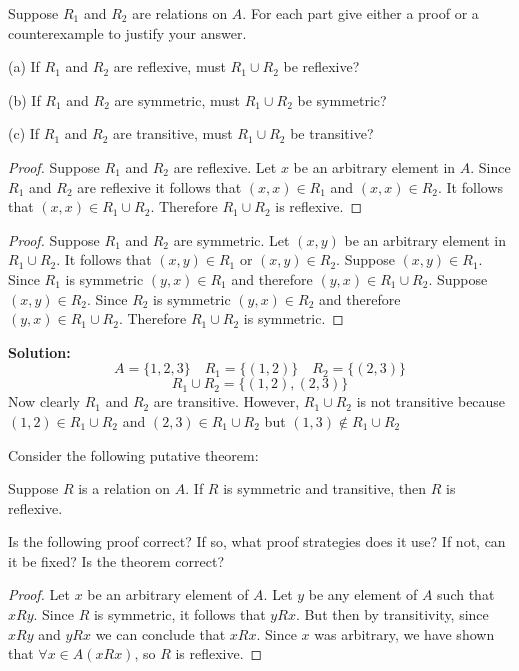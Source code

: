 \begin{tcolorbox}[title=Problem 13, breakable]
    Suppose $R_1$ and $R_2$ are relations on $A$.
    For each part give either a proof or a counterexample to justify your answer.

    (a) If $R_1$ and $R_2$ are reflexive, must $R_1 \cup R_2$ be reflexive?

    (b) If $R_1$ and $R_2$ are symmetric, must $R_1 \cup R_2$ be symmetric?

    (c) If $R_1$ and $R_2$ are transitive, must $R_1 \cup R_2$ be transitive?
\end{tcolorbox}

\begin{proof}
    Suppose $R_1$ and $R_2$ are reflexive.
    Let $x$ be an arbitrary element in $A$.
    Since $R_1$ and $R_2$ are reflexive it follows that $(x, x) \in R_1$ and $(x, x) \in R_2$.
    It follows that $(x, x) \in R_1 \cup R_2$.
    Therefore $R_1 \cup R_2$ is reflexive.
\end{proof}

\begin{proof}
    Suppose $R_1$ and $R_2$ are symmetric.
    Let $(x, y)$ be an arbitrary element in $R_1 \cup R_2$.
    It follows that $(x, y) \in R_1$ or $(x, y) \in R_2$.
    Suppose $(x, y) \in R_1$.
    Since $R_1$ is symmetric $(y, x) \in R_1$ and therefore $(y, x) \in R_1 \cup R_2$.
    Suppose $(x, y) \in R_2$.
    Since $R_2$ is symmetric $(y, x) \in R_2$ and therefore $(y, x) \in R_1 \cup R_2$.
    Therefore $R_1 \cup R_2$ is symmetric.
\end{proof}

\textbf{Solution:}
\[A = \{1, 2, 3\} \quad R_1 = \{(1, 2)\} \quad R_2 = \{(2, 3)\}\]
\[R_1 \cup R_2 = \{(1, 2), (2, 3)\}\]
Now clearly $R_1$ and $R_2$ are transitive. However, $R_1 \cup R_2$ is not transitive because 
    $(1, 2) \in R_1 \cup R_2$ and $(2, 3) \in R_1 \cup R_2$
    but $(1, 3) \not \in R_1 \cup R_2$

\begin{tcolorbox}[title=Problem 22, breakable]
    Consider the following putative theorem:
    \begin{theorem}
        Suppose $R$ is a relation on $A$. If $R$ is symmetric and 
        transitive, then $R$ is reflexive.
    \end{theorem}
    Is the following proof correct? If so, what proof strategies does it use?
    If not, can it be fixed? Is the theorem correct?
    \begin{proof}
        Let $x$ be an arbitrary element of $A$. Let $y$ be any element of $A$
        such that $xRy$. Since $R$ is symmetric, it follows that $yRx$.
        But then by transitivity, since $xRy$ and $yRx$ we can conclude 
        that $xRx$. Since $x$ was arbitrary, we have shown that $\forall{x} \in A (xRx)$,
        so $R$ is reflexive.
    \end{proof}
\end{tcolorbox}

